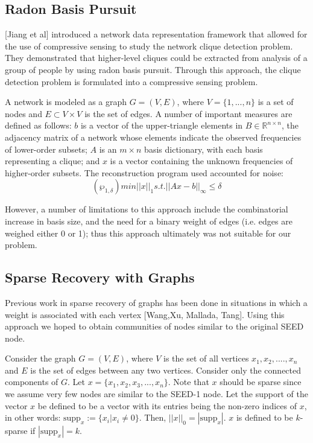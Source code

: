 \documentclass{article} %
\begin{document}
\subsection{Radon Basis Pursuit}
[Jiang et al] introduced a network data representation framework that allowed for the use of compressive sensing to study the network clique detection problem. They demonstrated that higher-level cliques could be extracted from analysis of a group of people by using radon basis pursuit. Through this approach, the clique detection problem is formulated into a compressive sensing problem.

A network is modeled as a graph $G = (V, E)$, where $V= \{ 1, ..., n \}$ is a set of nodes and $E \subset V \times V$ is the set of edges. A number of important measures are defined as follows: $b$ is a vector of the upper-triangle elements in $B \in  \mathbb{R}^{n \times n}$, the adjacency matrix of a network whose elements indicate the observed frequencies of lower-order subsets; $A$ is an $m \times n$ basis dictionary, with each basis representing a clique; and $x$ is a vector containing the unknown frequencies of higher-order subsets. The reconstruction program used accounted for noise:
\[
(\wp_{1,\delta}) 	min ||x||_1 s.t. ||Ax-b||_{\infty} \leq \delta
\]

However, a number of limitations to this approach include the combinatorial increase in basis size, and the need for a binary weight of edges (i.e. edges are weighed either 0 or 1); thus this approach ultimately was not suitable for our problem. 


\subsection{Sparse Recovery with Graphs}
Previous work in sparse recovery of graphs has been done in situations in which a weight is associated with each vertex [Wang,Xu, Mallada, Tang]. Using this approach we hoped to obtain communities of nodes similar to the original SEED node. 

Consider the graph $G = (V,E)$, where $V$ is the set of all vertices $x_1 , x_2 , .... , x_n$  and $E$ is the set of edges between any two vertices. Consider only the connected components of $G$. Let $x = \{x_1, x_2, x_3, ... , x_n\}$. Note that $x$ should be sparse since we assume very few nodes are similar to the SEED-1 node. 
Let the support of the vector $x$ be defined to be a vector with its entries being the non-zero indices of $x$, in other words: $\textrm{supp}_x :=\{x_i | x_i \neq  0\}$. Then, $||x||_0 = |\textrm{supp}_x|$. $x$ is defined to be $k$-sparse if $ |\textrm{supp}_x| = k$.
\end{document}
